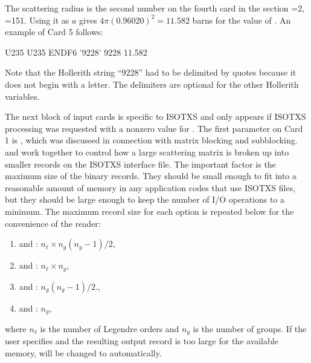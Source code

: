 \noindent
The scattering radius is the second number on the fourth card in the
section =2, =151.  Using it as $a$ gives
$4\pi(0.96020)^2=11.582$ barns
for the value of .  An example of Card 5 follows:

\small
\begin{ccode}

  U235 U235 ENDF6 '9228' 9228 11.582

\end{ccode}
\normalsize

\noindent
Note that the Hollerith string ``9228'' had to be delimited
by quotes because it does not begin with a letter.  The delimiters
are optional for the other Hollerith variables.

The next block of input cards is specific to ISOTXS and only appears
if ISOTXS processing was requested with a nonzero value for .
The first parameter on Card 1 is , which was
discussed in connection with matrix blocking and subblocking.
 and  work together to control how
a large scattering matrix is broken up into smaller records on
the ISOTXS interface file.  The important factor is the maximum
size of the binary records.  They should be small enough to fit into
a reasonable amount of memory in any application codes that use
ISOTXS files, but they should be large enough to keep the
number of I/O operations to a minimum.  The maximum record size
for each option is repeated below for the convenience of the
reader:

\begin{singlespace}
\begin{enumerate}

\item { and }: $n_\ell\times n_g(n_g{-}1)/2$,
\item { and }: $n_\ell\times n_g$,
\item { and }: $n_g(n_g{-}1)/2$.,
\item { and }:  $n_g$,

\end{enumerate}
\end{singlespace}

\noindent
where $n_\ell$ is the number of Legendre orders and $n_g$ is the
number of groups.  If the user specifies  and the
resulting output record is too large for the available memory,
 will be changed to  automatically.


